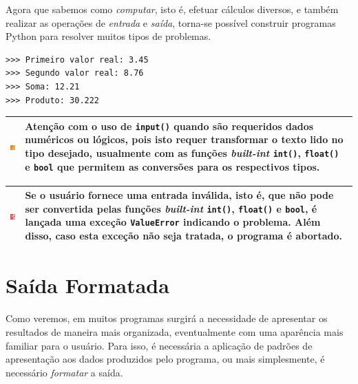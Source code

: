 \documentclass[
]{book}
\begin{document}
Agora que sabemos como \emph{computar}, isto é, efetuar cálculos diversos, e também realizar as operações de \emph{entrada} e \emph{saída}, torna-se possível construir programas Python para resolver muitos tipos de problemas.

\begin{verbatim}
>>> Primeiro valor real: 3.45
>>> Segundo valor real: 8.76
>>> Soma: 12.21
>>> Produto: 30.222
\end{verbatim}

\begin{longtable}[]{@{}
  >{\centering\arraybackslash}p{}
  >{\raggedright\arraybackslash}p{}@{}}
\toprule
\includegraphics{images/warn.png} & Atenção com o uso de \texttt{input()} quando são requeridos dados numéricos ou lógicos, pois isto requer transformar o texto lido no tipo desejado, usualmente com as funções \emph{built-int} \texttt{int()}, \texttt{float()} e \texttt{bool} que permitem as conversões para os respectivos tipos. \\
\midrule
\endhead
\bottomrule
\end{longtable}

\begin{longtable}[]{@{}
  >{\centering\arraybackslash}p{}
  >{\raggedright\arraybackslash}p{}@{}}
\toprule
\includegraphics{images/dont.png} & Se o usuário fornece uma entrada inválida, isto é, que não pode ser convertida pelas funções \emph{built-int} \texttt{int()}, \texttt{float()} e \texttt{bool}, é lançada uma exceção \texttt{ValueError} indicando o problema. Além disso, caso esta exceção não seja tratada, o programa é abortado. \\
\midrule
\endhead
\bottomrule
\end{longtable}

\hypertarget{e-s-format}{%
\section{Saída Formatada}\label{e-s-format}}

Como veremos, em muitos programas surgirá a necessidade de apresentar os resultados de maneira mais organizada, eventualmente com uma aparência mais familiar para o usuário. Para isso, é necessária a aplicação de padrões de apresentação aos dados produzidos pelo programa, ou mais simplesmente, é necessário \emph{formatar} a saída.
\end{document}
